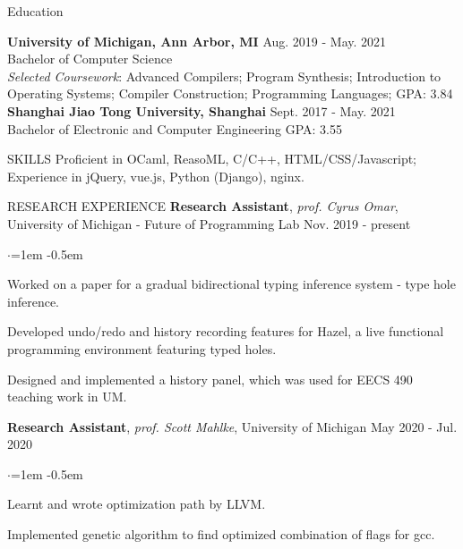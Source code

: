 \documentclass{resume} %
\newcommand{\rrsection}[5]{%
 {\textbf{#1}, }{\textit{#2},} {#3}\hfill{#4} \noindent
  \begin{list}{$\cdot$}{\leftmargin=1em}
   \itemsep -0.5em \vspace{-0.5em} 
  #5
  \end{list}
}
\begin{document}

\begin{rSection}{Education}

{\bf University of Michigan, Ann Arbor, MI} \hfill {Aug. 2019 - May. 2021} 
\\ Bachelor of Computer Science
\\ \textit{Selected Coursework}: Advanced Compilers; Program Synthesis; Introduction to Operating Systems; Compiler Construction; Programming Languages; 
 \hfill { GPA: 3.84}
\\{\bf Shanghai Jiao Tong University, Shanghai} \hfill {Sept. 2017 - May. 2021} 
\\Bachelor of Electronic and Computer Engineering 
 \hfill { GPA: 3.55}


\end{rSection}

\begin{rSection}{SKILLS}
Proficient in OCaml, ReasoML, C/C++, HTML/CSS/Javascript; Experience in jQuery, vue.js, Python (Django), nginx.
\end{rSection}
  
\begin{rSection}{RESEARCH EXPERIENCE}
\rrsection{Research Assistant}{prof. Cyrus Omar}{University of Michigan - Future of Programming Lab}{ Nov. 2019 - present}{
  \item Worked on a paper for a gradual bidirectional typing inference system - type hole inference. 
  \item Developed undo/redo and history recording features for Hazel, a live functional programming environment featuring typed holes.
  \item Designed and implemented a history panel, which was used for EECS 490 teaching work in UM. 
}
	
\rrsection{Research Assistant}{prof. Scott Mahlke}{University of Michigan}{ May 2020 - Jul. 2020}{
\item Learnt and wrote optimization path by LLVM.
  \item Implemented genetic algorithm to find optimized combination of flags for gcc.
}	
\end{rSection}
\end{document}
